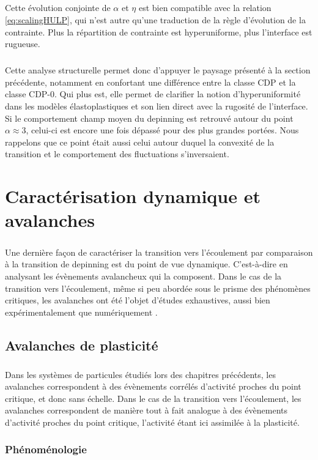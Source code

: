 \subparagraph{}Cette évolution conjointe de $\alpha$ et $\eta$ est bien compatible avec la relation \autoref{eq:scalingHULP}, qui n'est autre qu'une traduction de la règle d'évolution de la contrainte. Plus la répartition de contrainte est hyperuniforme, plus l'interface est rugueuse.

\subparagraph{}Cette analyse structurelle permet donc d'appuyer le paysage présenté à la section précédente, notamment en confortant une différence entre la classe CDP et la classe CDP-0. Qui plus est, elle permet de clarifier la notion d'hyperuniformité dans les modèles élastoplastiques et son lien direct avec la rugosité de l'interface. Si le comportement champ moyen du depinning est retrouvé autour du point $\alpha \approx 3$, celui-ci est encore une fois dépassé pour des plus grandes portées. Nous rappelons que ce point était aussi celui autour duquel la convexité de la transition et le comportement des fluctuations s'inversaient.

\section{Caractérisation dynamique et avalanches}

\subparagraph{}Une dernière façon de caractériser la transition vers l'écoulement par comparaison à la transition de depinning est du point de vue dynamique. C'est-à-dire en analysant les évènements avalancheux qui la composent. Dans le cas de la transition vers l'écoulement, même si peu abordée sous le prisme des phénomènes critiques, les avalanches ont été l'objet d'études exhaustives, aussi bien expérimentalement que numériquement \cite{sun_plasticity_2010, lauridsen_shear-induced_2002, salerno_effect_2013, oyama_unified_2021, talamali_avalanches_2011, liu_driving_2016}.

\subsection{Avalanches de plasticité}

\subparagraph{}Dans les systèmes de particules étudiés lors des chapitres précédents, les avalanches correspondent à des évènements corrélés d'activité proches du point critique, et donc sans échelle. Dans le cas de la transition vers l'écoulement, les avalanches correspondent de manière tout à fait analogue à des évènements d'activité proches du point critique, l'activité étant ici assimilée à la plasticité.

\subsubsection{Phénoménologie}

